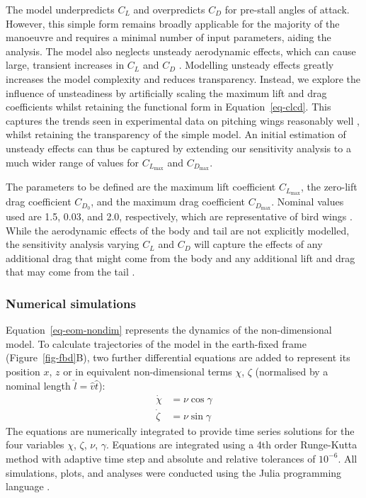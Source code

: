 The model underpredicts $C_L$ and overpredicts $C_D$ for pre-stall angles of attack. However, this simple form remains broadly applicable for the majority of the manoeuvre and requires a minimal number of input parameters, aiding the analysis. The model also neglects unsteady aerodynamic effects, which can cause large, transient increases in $C_L$ and $C_D$ \cite{granlundUnsteadyPitchingFlat2013,poletUnsteadyDynamicsRapid2015}. Modelling unsteady effects greatly increases the model complexity and reduces transparency. Instead, we explore the influence of unsteadiness by artificially scaling the maximum lift and drag coefficients whilst retaining the functional form in Equation~\eqref{eq-clcd}. This captures the trends seen in experimental data on pitching wings reasonably well \cite{stricklandForceCoefficientsNACA00151987}, whilst retaining the transparency of the simple model. An initial estimation of unsteady effects can thus be captured by extending our sensitivity analysis to a much wider range of values for $C_{L_{\max}}$ and $C_{D_{\max}}$.

The parameters to be defined are the maximum lift coefficient $C_{L_{\max}}$, the zero-lift drag coefficient $C_{D_0}$, and the maximum drag coefficient $C_{D_{\max}}$. Nominal values used are 1.5, 0.03, and 2.0, respectively, which are representative of bird wings \cite{usherwoodAerodynamicsRevolvingWings2002a,parslewPredictingPoweroptimalKinematics2015}. While the aerodynamic effects of the body and tail are not explicitly modelled, the sensitivity analysis varying $C_L$ and $C_D$ will capture the effects of any additional drag that might come from the body and any additional lift and drag that may come from the tail \cite{usherwoodHighAerodynamicLift2020}.

\subsubsection{Numerical simulations}\label{sec-methods-numerical}

Equation~\eqref{eq-eom-nondim} represents the dynamics of the non-dimensional model. To calculate trajectories of the model in the earth-fixed frame (Figure~\ref{fig-fbd}B), two further differential equations are added to represent its position $x$, $z$ or in equivalent non-dimensional terms $\chi$, $\zeta$ (normalised by a nominal length $\hat{l} = \hat{v}\hat{t}$):
\begin{equation}
    \begin{aligned}
        \dot{\chi}  & = \nu\cos\gamma \\
        \dot{\zeta} & = \nu\sin\gamma
    \end{aligned}
    \label{eq-xdot-nondim}
\end{equation}
The equations are numerically integrated to provide time series solutions for the four variables $\chi$, $\zeta$, $\nu$, $\gamma$. Equations are integrated using a 4th order Runge-Kutta method with adaptive time step and absolute and relative tolerances of $10^{-6}$. All simulations, plots, and analyses were conducted using the Julia programming language \cite{bezansonJuliaFreshApproach2017,rackauckasDifferentialequationsjlaPerformantFeaturerich2017,caillauOptimalControljlJuliaPackage2025,DanischKrumbiegel2021}.


